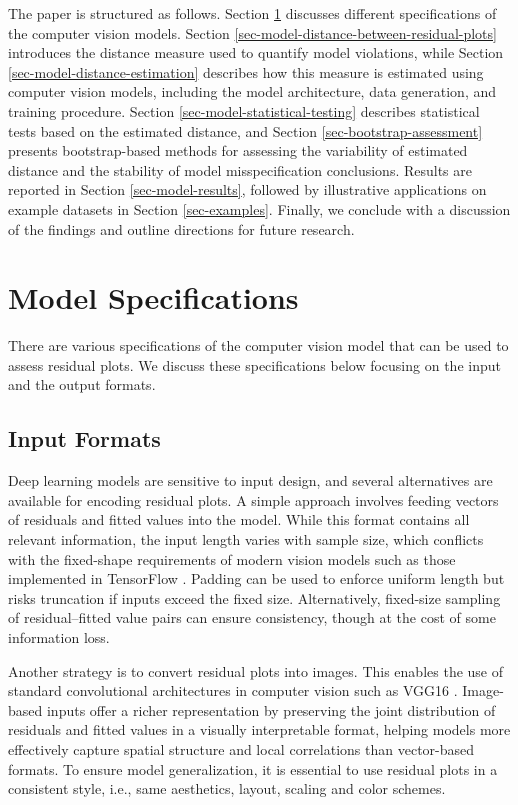 \documentclass[]{interact}
\theoremstyle{plain}%
\theoremstyle{definition}
\theoremstyle{remark}
\begin{document}
The paper is structured as follows. Section
\ref{sec-model-specifications} discusses different specifications of the
computer vision models. Section
\ref{sec-model-distance-between-residual-plots} introduces the distance
measure used to quantify model violations, while Section
\ref{sec-model-distance-estimation} describes how this measure is
estimated using computer vision models, including the model
architecture, data generation, and training procedure. Section
\ref{sec-model-statistical-testing} describes statistical tests based on
the estimated distance, and Section \ref{sec-bootstrap-assessment}
presents bootstrap-based methods for assessing the variability of
estimated distance and the stability of model misspecification
conclusions. Results are reported in Section \ref{sec-model-results},
followed by illustrative applications on example datasets in Section
\ref{sec-examples}. Finally, we conclude with a discussion of the
findings and outline directions for future research.

\section{Model Specifications}\label{sec-model-specifications}

There are various specifications of the computer vision model that can
be used to assess residual plots. We discuss these specifications below
focusing on the input and the output formats.

\subsection{Input Formats}\label{input-formats}

Deep learning models are sensitive to input design, and several
alternatives are available for encoding residual plots. A simple
approach involves feeding vectors of residuals and fitted values into
the model. While this format contains all relevant information, the
input length varies with sample size, which conflicts with the
fixed-shape requirements of modern vision models such as those
implemented in TensorFlow \citep{abadi2016tensorflow}. Padding can be
used to enforce uniform length but risks truncation if inputs exceed the
fixed size. Alternatively, fixed-size sampling of residual--fitted value
pairs can ensure consistency, though at the cost of some information
loss.

Another strategy is to convert residual plots into images. This enables
the use of standard convolutional architectures in computer vision such
as VGG16 \citep{simonyan2014very}. Image-based inputs offer a richer
representation by preserving the joint distribution of residuals and
fitted values in a visually interpretable format, helping models more
effectively capture spatial structure and local correlations than
vector-based formats. To ensure model generalization, it is essential to
use residual plots in a consistent style, i.e., same aesthetics, layout,
scaling and color schemes.
\end{document}
